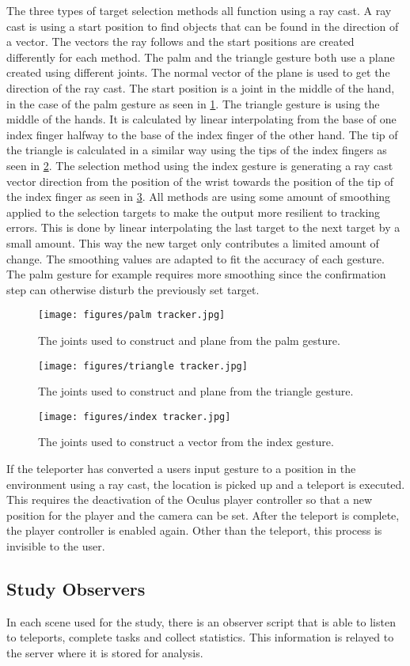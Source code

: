 The three types of target selection methods all function using a ray cast. A ray cast is using a start position to find objects that can be found in the direction of a vector. The vectors the ray follows and the start positions are created differently for each method. 
The palm and the triangle gesture both use a plane created using different joints. The normal vector of the plane is used to get the direction of the ray cast. The start position is a joint in the middle of the hand, in the case of the palm gesture as seen in \ref{fig:palmTracker}. The triangle gesture is using the middle of the hands. It is calculated by linear interpolating from the base of one index finger halfway to the base of the index finger of the other hand. The tip of the triangle is calculated in a similar way using the tips of the index fingers as seen in \ref{fig:triangleTracker}. The selection method using the index gesture is generating a ray cast vector direction from the position of the wrist towards the position of the tip of the index finger as seen in \ref{fig:indexTracker}. All methods are using some amount of smoothing applied to the selection targets to make the output more resilient to tracking errors. This is done by linear interpolating the last target to the next target by a small amount. This way the new target only contributes a limited amount of change. The smoothing values are adapted to fit the accuracy of each gesture. The palm gesture for example requires more smoothing since the confirmation step can otherwise disturb the previously set target.

\begin{figure}[!ht]
    \centering
    \texttt{[image: figures/palm tracker.jpg]}
    \caption{The joints used to construct and plane from the palm gesture.}
    \label{fig:palmTracker}
\end{figure}
\begin{figure}[!ht]
    \centering
    \texttt{[image: figures/triangle tracker.jpg]}
    \caption{The joints used to construct and plane from the triangle gesture.}
    \label{fig:triangleTracker}
\end{figure}
\begin{figure}[!ht]
    \centering
    \texttt{[image: figures/index tracker.jpg]}
    \caption{The joints used to construct a vector from the index gesture.}
    \label{fig:indexTracker}
\end{figure}

If the teleporter has converted a users input gesture to a position in the environment using a ray cast, the location is picked up and a teleport is executed. This requires the deactivation of the Oculus player controller so that a new position for the player and the camera can be set. After the teleport is complete, the player controller is enabled again. Other than the teleport, this process is invisible to the user. 

\subsection{Study Observers}
In each scene used for the study, there is an observer script that is able to listen to teleports, complete tasks and collect statistics. This information is relayed to the server where it is stored for analysis.